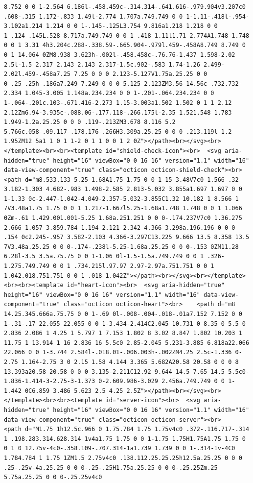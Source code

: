 \documentclass[
  letterpaper,
]{book}
\begin{document}
\begin{verbatim}
8.752 0 0 1-2.564 6.186l-.458.459c-.314.314-.641.616-.979.904v3.207c0 .608-.315 1.172-.833 1.49l-2.774 1.707a.749.749 0 0 1-1.11-.418l-.954-3.102a1.214 1.214 0 0 1-.145-.125L3.754 9.816a1.218 1.218 0 0 1-.124-.145L.528 8.717a.749.749 0 0 1-.418-1.11l1.71-2.774A1.748 1.748 0 0 1 3.31 4h3.204c.288-.338.59-.665.904-.979l.459-.458A8.749 8.749 0 0 1 14.064 0ZM8.938 3.623h-.002l-.458.458c-.76.76-1.437 1.598-2.02 2.5l-1.5 2.317 2.143 2.143 2.317-1.5c.902-.583 1.74-1.26 2.499-2.02l.459-.458a7.25 7.25 0 0 0 2.123-5.127V1.75a.25.25 0 0 0-.25-.25h-.186a7.249 7.249 0 0 0-5.125 2.123ZM3.56 14.56c-.732.732-2.334 1.045-3.005 1.148a.234.234 0 0 1-.201-.064.234.234 0 0 1-.064-.201c.103-.671.416-2.273 1.15-3.003a1.502 1.502 0 1 1 2.12 2.12Zm6.94-3.935c-.088.06-.177.118-.266.175l-2.35 1.521.548 1.783 1.949-1.2a.25.25 0 0 0 .119-.213ZM3.678 8.116 5.2 5.766c.058-.09.117-.178.176-.266H3.309a.25.25 0 0 0-.213.119l-1.2 1.95ZM12 5a1 1 0 1 1-2 0 1 1 0 0 1 2 0Z"></path><br></svg><br></template><br><br><template id="shield-check-icon"><br>  <svg aria-hidden="true" height="16" viewBox="0 0 16 16" version="1.1" width="16" data-view-component="true" class="octicon octicon-shield-check"><br>    <path d="m8.533.133 5.25 1.68A1.75 1.75 0 0 1 15 3.48V7c0 1.566-.32 3.182-1.303 4.682-.983 1.498-2.585 2.813-5.032 3.855a1.697 1.697 0 0 1-1.33 0c-2.447-1.042-4.049-2.357-5.032-3.855C1.32 10.182 1 8.566 1 7V3.48a1.75 1.75 0 0 1 1.217-1.667l5.25-1.68a1.748 1.748 0 0 1 1.066 0Zm-.61 1.429.001.001-5.25 1.68a.251.251 0 0 0-.174.237V7c0 1.36.275 2.666 1.057 3.859.784 1.194 2.121 2.342 4.366 3.298a.196.196 0 0 0 .154 0c2.245-.957 3.582-2.103 4.366-3.297C13.225 9.666 13.5 8.358 13.5 7V3.48a.25.25 0 0 0-.174-.238l-5.25-1.68a.25.25 0 0 0-.153 0ZM11.28 6.28l-3.5 3.5a.75.75 0 0 1-1.06 0l-1.5-1.5a.749.749 0 0 1 .326-1.275.749.749 0 0 1 .734.215l.97.97 2.97-2.97a.751.751 0 0 1 1.042.018.751.751 0 0 1 .018 1.042Z"></path><br></svg><br></template><br><br><template id="heart-icon"><br>  <svg aria-hidden="true" height="16" viewBox="0 0 16 16" version="1.1" width="16" data-view-component="true" class="octicon octicon-heart"><br>    <path d="m8 14.25.345.666a.75.75 0 0 1-.69 0l-.008-.004-.018-.01a7.152 7.152 0 0 1-.31-.17 22.055 22.055 0 0 1-3.434-2.414C2.045 10.731 0 8.35 0 5.5 0 2.836 2.086 1 4.25 1 5.797 1 7.153 1.802 8 3.02 8.847 1.802 10.203 1 11.75 1 13.914 1 16 2.836 16 5.5c0 2.85-2.045 5.231-3.885 6.818a22.066 22.066 0 0 1-3.744 2.584l-.018.01-.006.003h-.002ZM4.25 2.5c-1.336 0-2.75 1.164-2.75 3 0 2.15 1.58 4.144 3.365 5.682A20.58 20.58 0 0 0 8 13.393a20.58 20.58 0 0 0 3.135-2.211C12.92 9.644 14.5 7.65 14.5 5.5c0-1.836-1.414-3-2.75-3-1.373 0-2.609.986-3.029 2.456a.749.749 0 0 1-1.442 0C6.859 3.486 5.623 2.5 4.25 2.5Z"></path><br></svg><br></template><br><br><template id="server-icon"><br>  <svg aria-hidden="true" height="16" viewBox="0 0 16 16" version="1.1" width="16" data-view-component="true" class="octicon octicon-server"><br>    <path d="M1.75 1h12.5c.966 0 1.75.784 1.75 1.75v4c0 .372-.116.717-.314 1 .198.283.314.628.314 1v4a1.75 1.75 0 0 1-1.75 1.75H1.75A1.75 1.75 0 0 1 0 12.75v-4c0-.358.109-.707.314-1a1.739 1.739 0 0 1-.314-1v-4C0 1.784.784 1 1.75 1ZM1.5 2.75v4c0 .138.112.25.25.25h12.5a.25.25 0 0 0 .25-.25v-4a.25.25 0 0 0-.25-.25H1.75a.25.25 0 0 0-.25.25Zm.25 5.75a.25.25 0 0 0-.25.25v4c0 
\end{verbatim}
\end{document}
